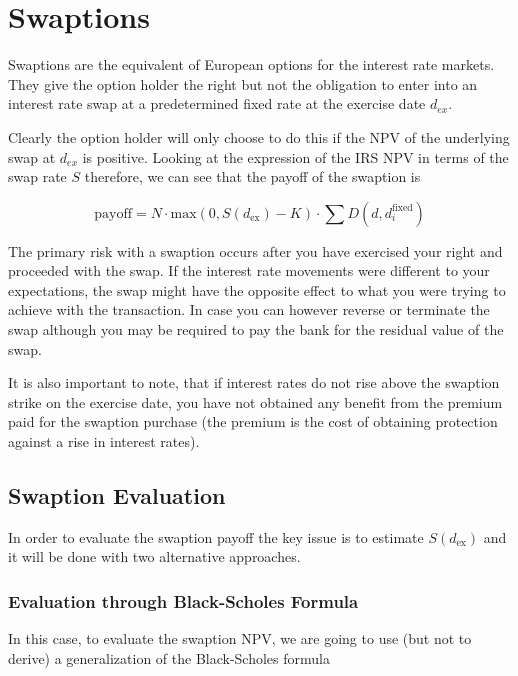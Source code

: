 \section{Swaptions}
\label{interest-rate-swaptions}

Swaptions are the equivalent of European options for the interest rate markets. They give the option holder the right but not the obligation to enter into an interest rate swap at a predetermined fixed rate at the exercise date \(d_{ex}\).

Clearly the option holder will only choose to do this if the NPV of the underlying swap at \(d_{ex}\) is positive. Looking at the expression of the IRS NPV in terms of the swap rate \(S\) therefore, we can see that the payoff of the swaption is

\begin{equation}
\mathrm{payoff} = N\cdot \mathrm{max}(0, S(d_{\mathrm{ex}}) - K)\cdot\sum D(d, d_i^{\mathrm{fixed}})
\label{eq:swaption_payoff}
\end{equation}

The primary risk with a swaption occurs after you have exercised your right and proceeded with the swap. If the interest rate movements were different to your expectations, the swap might have the opposite effect to what you were trying to achieve with the transaction. In case you can however reverse or terminate the swap although you may be required to pay the bank for the residual value of the swap.

It is also important to note, that if interest rates do not rise above the swaption strike on the exercise date, you have not obtained any benefit from the premium paid for the swaption purchase (the premium is the cost of obtaining protection against a rise in interest rates).

\subsection{Swaption Evaluation}

In order to evaluate the swaption payoff the key issue is to estimate $S(d_{\mathrm{ex}})$ and it will be done with two alternative approaches.

\subsubsection{Evaluation through Black-Scholes Formula}
\label{evaluation-through-black-scholes-formula}

In this case, to evaluate the swaption NPV, we are going to use (but not to derive) a generalization of the Black-Scholes formula

